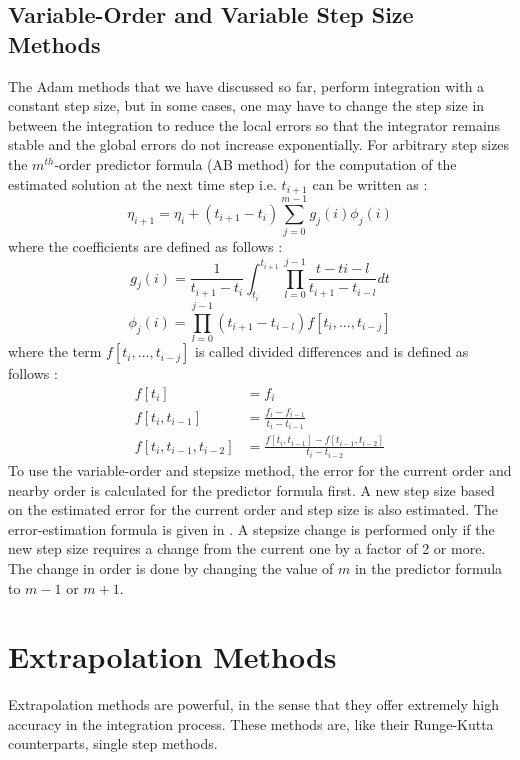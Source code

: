 \subsection{Variable-Order and Variable Step Size Methods}
The Adam methods that we have discussed so far, perform integration with a constant step size, but in some cases, one may have to change the step size in between the integration to reduce the local errors so that the integrator remains stable and the global errors do not increase exponentially. For arbitrary step sizes the $m^{th}$-order predictor formula (\gls{AB} method) for the computation of the estimated solution at the next time step i.e. $t_{i+1}$ can be written as \cite{gillbook}:
\begin{equation}
\label{var1}
\eta_{i+1} = \eta_i + (t_{i+1} - t_i) \sum_{j=0}^{m-1}g_j(i) \phi_j(i)
\end{equation}
%
where the coefficients are defined as follows \cite{gillbook}:
\begin{equation}
\label{varg}
g_j(i) = \frac{1}{t_{i+1} - t_i} \int_{t_i}^{t_{i+1}} \prod_{l=0}^{j-1} \frac{t-t{i-l}}{t_{i+1} - t_{i-l}} dt
\end{equation}
%
\begin{equation}
\label{varphi}
\phi_j(i) = \prod_{l=0}^{j-1}(t_{i+1} - t_{i-l}) f[t_i,...,t_{i-j}]
\end{equation}
%
where the term $f[t_i,...,t_{i-j}]$ is called divided differences and is defined as follows \cite{gillbook}:
\begin{equation}
\begin{aligned}
f[t_i] &= f_i \\
f[t_i, t_{i-1}] &= \frac{f_i - f_{i-1}}{t_i - t_{i-1}} \\
f[t_i, t_{i-1}, t_{i-2}] &= \frac{f[t_i, t_{i-1}] - f[t_{i-1}, t_{i-2}]}{t_i - t_{i-2}}
\end{aligned}
\end{equation}
%
To use the variable-order and stepsize method, the error for the current order and nearby order is calculated for the predictor formula first. A new step size based on the estimated error for the current order and step size is also estimated. The error-estimation formula is given in . A stepsize change is performed only if the new step size requires a change from the current one by a factor of 2 or more. The change in order is done by changing the value of $m$ in the predictor formula to $m-1$ or $m+1$.

\section{Extrapolation Methods}
Extrapolation methods are powerful, in the sense that they offer extremely high accuracy in the integration process. These methods are, like their Runge-Kutta counterparts, single step methods.

